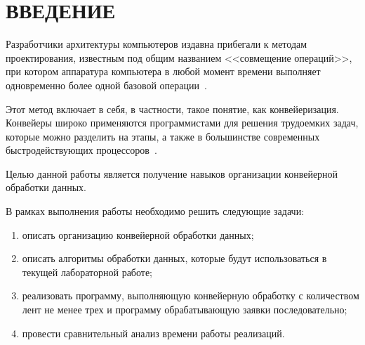 \chapter*{\hfill{\centering  ВВЕДЕНИЕ}\hfill}


Разработчики архитектуры компьютеров издавна прибегали к методам проектирования, известным под общим названием <<совмещение операций>>, при котором аппаратура компьютера в любой момент времени выполняет одновременно более одной базовой операции~\cite{conveyor}.

Этот метод включает в себя, в частности, такое понятие, как
конвейеризация. Конвейеры широко применяются программистами для решения трудоемких задач, которые можно разделить на этапы, а также в
большинстве современных быстродействующих процессоров~\cite{conveyor}.


Целью данной работы является получение навыков организации конвейерной обработки данных.

В рамках выполнения работы необходимо решить следующие задачи: 
\begin{enumerate}
	\item описать организацию конвейерной обработки данных;
	\item описать алгоритмы обработки данных, которые будут использоваться в текущей лабораторной работе;
	\item реализовать программу, выполняющую конвейерную обработку с количеством лент не менее трех  и программу обрабатывающую заявки последовательно;
	\item провести сравнительный анализ времени работы реализаций.
\end{enumerate}



